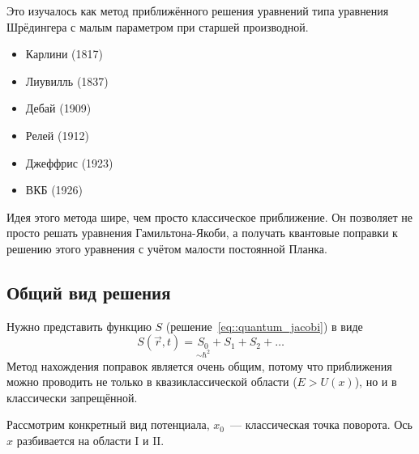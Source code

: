 Это изучалось как метод приближённого решения уравнений типа уравнения Шрёдингера с малым параметром при старшей производной.

\begin{itemize}
  \item Карлини (1817)
  \item Лиувилль (1837)
  \item Дебай (1909)
  \item Релей (1912)
  \item Джеффрис (1923)
  \item ВКБ (1926)
\end{itemize}

Идея этого метода шире, чем просто классическое приближение. Он позволяет не просто решать уравнения Гамильтона-Якоби, а получать квантовые поправки к решению этого уравнения с учётом малости постоянной Планка.

\subsection{Общий вид решения} 
Нужно представить функцию $S$ (решение~\eqref{eq::quantum_jacobi}) в виде
$$
    S(\vec r, t) = \underset{\sim \hbar^2}{S_0} + S_1 + S_2 + \ldots
$$
Метод нахождения поправок является очень общим, потому что приближения можно проводить не только в квазиклассической области ($E > U(x)$), но и в классически запрещённой.

Рассмотрим конкретный вид потенциала, $x_0$~--- классическая точка поворота. Ось $x$ разбивается на области $\mathrm{I}$ и $\mathrm{II}$.

